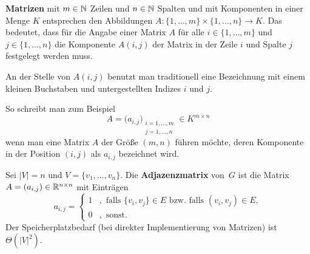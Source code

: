 \begin{defn}
	\textbf{Matrizen} mit $m \in \mathbb{N}$ Zeilen und $n \in \mathbb{N}$ Spalten und mit Komponenten in einer Menge $K$  entsprechen den Abbildungen $A : \{1,\ldots,m\} \times \{1,\ldots,n\} \to K$. Das bedeutet, dass für die Angabe einer Matrix $A$ für alle $i \in \{1,\ldots,m\}$ und $j \in \{1,\ldots,n\}$ die Komponente $A(i,j)$ der Matrix in der Zeile $i$ und Spalte $j$ festgelegt werden muss. 
	
	An der Stelle von $A(i,j)$ benutzt man traditionell eine Bezeichnung mit einem kleinen Buchstaben und untergestellten Indizes $i$ und $j$. 
	
	So schreibt man zum Beispiel
	\[
		A = \bigl (a_{i,j} \bigr)_{\substack{i=1,\ldots,m \\ j=1,\ldots,n}} \in K^{m \times n}
	\]
	wenn man eine Matrix $A$ der Größe $(m,n)$ führen möchte, deren Komponente in der Position $(i,j)$  als $a_{i,j}$ bezeichnet wird. 
\end{defn} 

\begin{defn} 
Sei $|V|=n$ und $V=\{v_1,\ldots,v_n\}$.
Die \textbf{Adjazenzmatrix} von~$G$ ist die Matrix $A=(a_{i,j}) \in \mathbb{R}^{n \times n}$ mit Einträgen
\[
a_{i,j} = \begin{cases}1&,\text{ falls }\{v_i,v_j\} \in E \text{ bzw.~falls }(v_i,v_j) \in E,\\ 0&,\text{ sonst}.\end{cases}
\]
Der Speicherplatzbedarf (bei direkter Implementierung von Matrizen) ist $\Theta(|V|^2)$.
\end{defn} 

\begin{bsp}\
\begin{center}
	\hfill
	\hfill
	\hfill\,
\end{center}

\end{bsp} 

